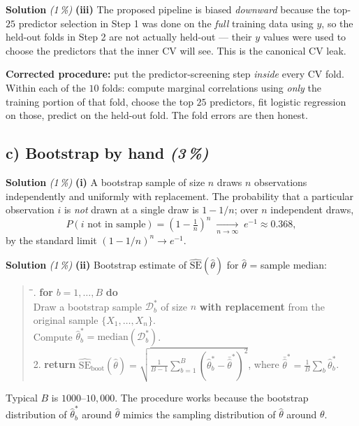 \documentclass[11pt,a4paper]{article}
\newcommand{\subpoints}[1]{\textit{(#1\,\%)}}
\newcommand{\sol}{\noindent\textbf{Solution}}
\begin{document}
\medskip
\sol{} \subpoints{1} \textbf{(iii)} The proposed pipeline is biased \emph{downward} because the
top-$25$ predictor selection in Step 1 was done on the \emph{full} training data using $y$, so
the held-out folds in Step 2 are not actually held-out --- their $y$ values were used to choose
the predictors that the inner CV will see. This is the canonical CV leak.

\textbf{Corrected procedure:} put the predictor-screening step \emph{inside} every CV fold. Within
each of the $10$ folds: compute marginal correlations using \emph{only} the training portion of
that fold, choose the top $25$ predictors, fit logistic regression on those, predict on the
held-out fold. The fold errors are then honest.

\subsection*{c) Bootstrap by hand \subpoints{3}}

\sol{} \subpoints{1} \textbf{(i)} A bootstrap sample of size $n$ draws $n$ observations
independently and uniformly with replacement. The probability that a particular observation $i$
is \emph{not} drawn at a single draw is $1 - 1/n$; over $n$ independent draws,
$$P(i\text{ not in sample}) = \left(1 - \tfrac{1}{n}\right)^n \;\xrightarrow[n\to\infty]{}\; e^{-1} \approx 0.368,$$
by the standard limit $(1-1/n)^n\to e^{-1}$.

\medskip
\sol{} \subpoints{1} \textbf{(ii)} Bootstrap estimate of $\widehat{\mathrm{SE}}(\hat\theta)$ for
$\hat\theta$ = sample median:
\begin{quote}\small
\begin{tabbing}
\hspace{1.5em}\=\hspace{1.5em}\=. \textbf{for} $b = 1, \ldots, B$ \textbf{do}\\
 Draw a bootstrap sample $\mathcal D^*_b$ of size $n$ \textbf{with replacement} from the original sample $\{X_1,\ldots,X_n\}$.\\
 Compute $\hat\theta^*_b = \mathrm{median}(\mathcal D^*_b)$.\\
2. \textbf{return} $\widehat{\mathrm{SE}}_{\mathrm{boot}}(\hat\theta) = \sqrt{\tfrac{1}{B-1}\sum_{b=1}^B (\hat\theta^*_b - \bar{\hat\theta}^*)^2}$, where $\bar{\hat\theta}^* = \tfrac{1}{B}\sum_b \hat\theta^*_b$.
\end{tabbing}
\end{quote}
Typical $B$ is $1000$--$10{,}000$. The procedure works because the bootstrap distribution of
$\hat\theta^*_b$ around $\hat\theta$ mimics the sampling distribution of $\hat\theta$ around
$\theta$.
\end{document}
